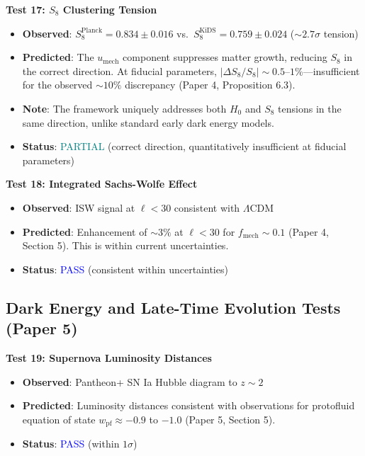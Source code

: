 \documentclass[11pt,a4paper]{article}
\newcommand{\umech}{\ensuremath{u_{\mathrm{mech}}}}
\theoremstyle{definition}
\theoremstyle{remark}
\begin{document}
\textbf{Test 17: $S_8$ Clustering Tension}

\begin{itemize}[leftmargin=*, itemsep=0.1em]
\item \textbf{Observed}: $S_8^{\mathrm{Planck}} = 0.834 \pm 0.016$ vs.\ $S_8^{\mathrm{KiDS}} = 0.759 \pm 0.024$ ($\sim 2.7\sigma$ tension)
\item \textbf{Predicted}: The $\umech$ component suppresses matter growth, reducing $S_8$ in the correct direction. At fiducial parameters, $|\Delta S_8/S_8| \sim 0.5$--$1\%$---insufficient for the observed $\sim 10\%$ discrepancy (Paper 4, Proposition 6.3).
\item \textbf{Note}: The framework uniquely addresses both $H_0$ and $S_8$ tensions in the same direction, unlike standard early dark energy models.
\item \textbf{Status}: \textcolor{teal}{PARTIAL} (correct direction, quantitatively insufficient at fiducial parameters)
\end{itemize}

\textbf{Test 18: Integrated Sachs-Wolfe Effect}

\begin{itemize}[leftmargin=*, itemsep=0.1em]
\item \textbf{Observed}: ISW signal at $\ell < 30$ consistent with $\Lambda$CDM
\item \textbf{Predicted}: Enhancement of $\sim 3\%$ at $\ell < 30$ for $f_{\mathrm{mech}} \sim 0.1$ (Paper 4, Section 5). This is within current uncertainties.
\item \textbf{Status}: \textcolor{blue}{PASS} (consistent within uncertainties)
\end{itemize}

\subsection{Dark Energy and Late-Time Evolution Tests (Paper 5)}
\label{sec:tests_dark_energy}

\textbf{Test 19: Supernova Luminosity Distances}

\begin{itemize}[leftmargin=*, itemsep=0.1em]
\item \textbf{Observed}: Pantheon+ SN Ia Hubble diagram to $z \sim 2$ \cite{Scolnic2018}
\item \textbf{Predicted}: Luminosity distances consistent with observations for protofluid equation of state $w_{\mathrm{pf}} \approx -0.9$ to $-1.0$ (Paper 5, Section 5).
\item \textbf{Status}: \textcolor{blue}{PASS} (within $1\sigma$)
\end{itemize}
\end{document}
